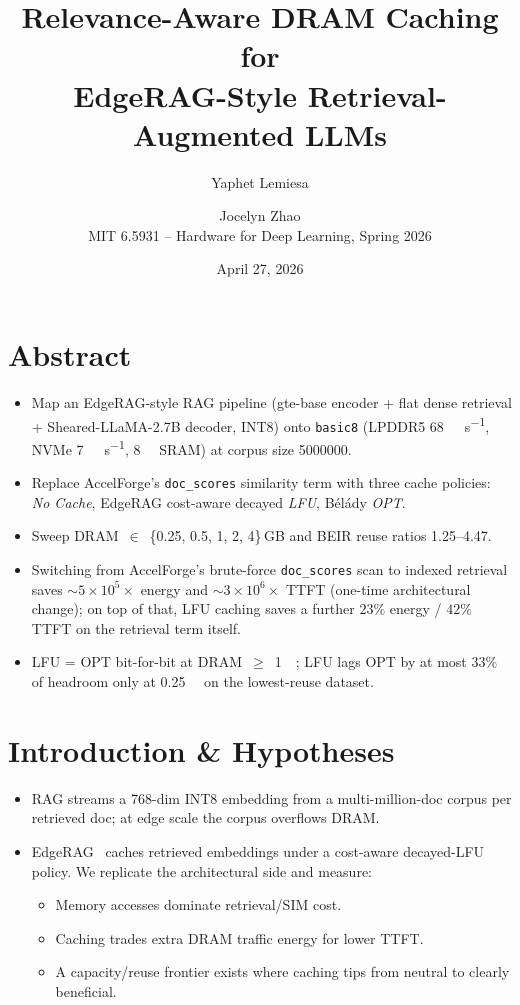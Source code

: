 \documentclass[11pt]{article}
\title{\bfseries Relevance-Aware DRAM Caching for\\
  EdgeRAG-Style Retrieval-Augmented LLMs}
\author{Yaphet Lemiesa \and Jocelyn Zhao \\
  \small MIT 6.5931 -- Hardware for Deep Learning, Spring 2026}
\date{April 27, 2026}
\begin{document}
\maketitle

\section*{Abstract}
\begin{itemize}
  \item Map an EdgeRAG-style RAG pipeline (gte-base encoder + flat dense retrieval + Sheared-LLaMA-2.7B decoder, INT8) onto \texttt{basic8} (LPDDR5 \SI{68}{\giga\byte\per\second}, NVMe \SI{7}{\giga\byte\per\second}, \SI{8}{\mega\byte} SRAM) at corpus size \num{5000000}.
  \item Replace AccelForge's \texttt{doc\_scores} similarity term with three cache policies: \emph{No Cache}, EdgeRAG cost-aware decayed \emph{LFU}, B\'el\'ady \emph{OPT}.
  \item Sweep DRAM~$\in$~\{0.25, 0.5, 1, 2, 4\}\,GB and BEIR reuse ratios 1.25--4.47.
  \item Switching from AccelForge's brute-force \texttt{doc\_scores} scan to indexed retrieval saves $\sim\!5{\times}10^{5}{\times}$ energy and $\sim\!3{\times}10^{6}{\times}$ TTFT (one-time architectural change); on top of that, LFU caching saves a further $23\%$ energy / $42\%$ TTFT on the retrieval term itself.
  \item LFU = OPT bit-for-bit at DRAM~$\geq$~\SI{1}{\giga\byte}; LFU lags OPT by at most $33\%$ of headroom only at \SI{0.25}{\giga\byte} on the lowest-reuse dataset.
\end{itemize}

\section{Introduction \& Hypotheses}
\begin{itemize}
  \item RAG streams a 768-dim INT8 embedding from a multi-million-doc corpus per retrieved doc; at edge scale the corpus overflows DRAM.
  \item EdgeRAG~\cite{edgerag} caches retrieved embeddings under a cost-aware decayed-LFU policy. We replicate the architectural side and measure:
    \begin{itemize}
      \item[\textbf{H1}] Memory accesses dominate retrieval/SIM cost.
      \item[\textbf{H2}] Caching trades extra DRAM traffic energy for lower TTFT.
      \item[\textbf{H3}] A capacity/reuse frontier exists where caching tips from neutral to clearly beneficial.
    \end{itemize}
\end{itemize}
\end{document}
